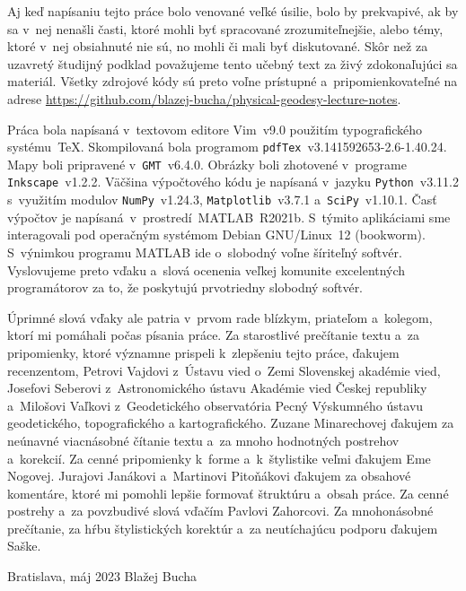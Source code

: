 \documentclass[a4paper, 12pt]{book}
\begin{document}
Aj keď napísaniu tejto práce bolo venované veľké úsilie, bolo by prekvapivé, ak 
by sa v~nej nenašli časti, ktoré mohli byť spracované zrozumiteľnejšie, alebo 
témy, ktoré v~nej obsiahnuté nie sú, no mohli či mali byť diskutované.  Skôr 
než za uzavretý študijný podklad považujeme tento učebný text za živý 
zdokonaľujúci sa materiál.  Všetky zdrojové kódy sú preto voľne prístupné 
a~pripomienkovateľné na adrese 
\url{https://github.com/blazej-bucha/physical-geodesy-lecture-notes}.

Práca bola napísaná v~textovom editore Vim~v9.0 použitím typografického 
systému~\TeX.  Skompilovaná bola programom 
\texttt{pdfTex}~v3.141592653-2.6-1.40.24.  Mapy boli pripravené 
v~\texttt{GMT}~v6.4.0.  Obrázky boli zhotovené v~programe 
\texttt{Inkscape}~v1.2.2.  Väčšina výpočtového kódu je napísaná v~jazyku 
\texttt{Python}~v3.11.2 s~využitím modulov \texttt{NumPy}~v1.24.3, 
\texttt{Matplotlib}~v3.7.1 a~\texttt{SciPy}~v1.10.1.  Časť výpočtov je 
napísaná~v~prostredí~MATLAB~R2021b.  S~týmito aplikáciami sme interagovali pod 
operačným systémom Debian GNU/Linux~12 (bookworm).  S~výnimkou programu MATLAB 
ide o~slobodný voľne šíriteľný softvér.  Vyslovujeme preto vďaku a~slová 
ocenenia veľkej komunite excelentných programátorov za to, že poskytujú 
prvotriedny slobodný softvér.

Úprimné slová vďaky ale patria v~prvom rade blízkym, priateľom a~kolegom, ktorí 
mi pomáhali počas písania práce.  Za starostlivé prečítanie textu a~za 
pripomienky, ktoré významne prispeli k~zlepšeniu tejto práce, ďakujem 
recenzentom, Petrovi Vajdovi z~Ústavu vied o~Zemi Slovenskej akadémie vied, 
Josefovi Seberovi z~Astronomického ústavu Akadémie vied Českej republiky 
a~Milošovi Vaľkovi z~Geodetického observatória Pecný Výskumného ústavu 
geodetického, topografického a kartografického.  Zuzane Minarechovej ďakujem za 
neúnavné viacnásobné čítanie textu a~za mnoho hodnotných postrehov a~korekcií.  
Za cenné pripomienky k~forme a~k~štylistike veľmi ďakujem Eme Nogovej.  
Jurajovi Janákovi a~Martinovi Pitoňákovi ďakujem za obsahové komentáre, ktoré 
mi pomohli lepšie formovať štruktúru a~obsah práce.  Za cenné postrehy a~za 
povzbudivé slová vďačím Pavlovi Zahorcovi.  Za mnohonásobné prečítanie, za hŕbu 
štylistických korektúr a~za neutíchajúcu podporu ďakujem Saške.


\vspace{4ex}

\noindent Bratislava, máj 2023 \hfill Blažej Bucha
\end{document}
